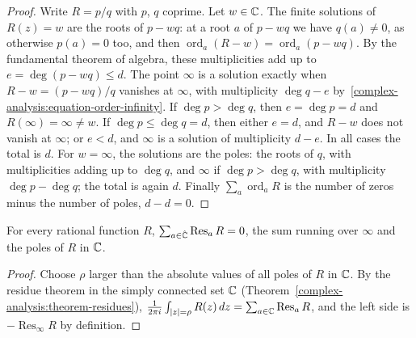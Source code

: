 \begin{proof}
Write $R = p/q$ with $p$, $q$ coprime. Let $w \in \mathbb{C}$. The finite solutions of $R(z) = w$ are the roots of $p - wq$: at a root $a$ of $p - wq$ we have $q(a) \neq 0$, as otherwise $p(a) = 0$ too, and then
$\operatorname{ord}_a(R - w) = \operatorname{ord}_a(p - wq)$. By the fundamental theorem of algebra, these multiplicities add up to $e = \deg(p - wq) \leq d$. The point $\infty$ is a solution exactly when
$R - w = (p - wq)/q$ vanishes at $\infty$, with multiplicity $\deg q - e$ by~\eqref{complex-analysis:equation-order-infinity}. If $\deg p > \deg q$, then $e = \deg p = d$ and $R(\infty) = \infty \neq w$. If
$\deg p \leq \deg q = d$, then either $e = d$, and $R - w$ does not vanish at $\infty$; or $e < d$, and $\infty$ is a solution of multiplicity $d - e$. In all cases the total is $d$. For $w = \infty$, the solutions
are the poles: the roots of $q$, with multiplicities adding up to $\deg q$, and $\infty$ if $\deg p > \deg q$, with multiplicity $\deg p - \deg q$; the total is again $d$. Finally $\sum_a\operatorname{ord}_aR$ is the number
of zeros minus the number of poles, $d - d = 0$.
\end{proof}

\begin{proposition}\label{complex-analysis:proposition-residues-sphere}
For every rational function $R$, $\sum_{a \in \hat{\mathbb{C}}}\operatorname{Res}_aR = 0$, the sum running over $\infty$ and the poles of $R$ in $\mathbb{C}$.
\end{proposition}

\begin{proof}
Choose $\rho$ larger than the absolute values of all poles of $R$ in $\mathbb{C}$. By the residue theorem in the simply connected set $\mathbb{C}$ (Theorem~\ref{complex-analysis:theorem-residues}),
$\frac{1}{2\pi i}\int_{|z| = \rho}R(z)\,dz = \sum_{a \in \mathbb{C}}\operatorname{Res}_aR$, and the left side is $-\operatorname{Res}_\infty R$ by definition.
\end{proof}

